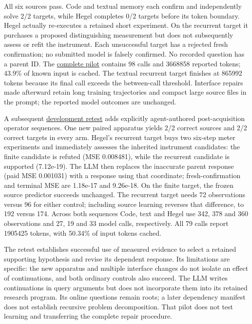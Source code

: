 \documentclass[twoside,11pt]{article}
\begin{document}
All six sources pass. Code and textual memory each confirm and independently
solve 2/2 targets, while Hegel completes 0/2 targets before its token boundary.
Hegel actually re-executes a retained short experiment. On the recurrent target
it purchases a proposed distinguishing measurement but does not subsequently
assess or refit the instrument. Each unsuccessful target has a rejected fresh
confirmation; no submitted model is falsely confirmed. No recorded question
has a parent ID. The \hyperlink{artifact-56}{complete pilot}
contains 98 calls and 3668858 reported tokens; 43.9\% of known input is cached.
The textual recurrent target finishes at 865992 tokens because its final call
exceeds the between-call threshold. Interface repairs made afterward retain
long training trajectories and compact large source files in the prompt;
the reported model outcomes are unchanged.


A subsequent \hyperlink{artifact-57}{development retest}
adds explicitly agent-authored post-acquisition operator sequences. One new
paired apparatus yields 2/2 correct sources and 2/2 correct targets in every
arm. Hegel's recurrent target buys two six-step meter experiments and immediately
assesses the inherited instrument candidates: the finite candidate is refuted
(MSE 0.008481), while the recurrent candidate is supported (7.12e-19). The LLM
then replaces the inaccurate parent response (paid MSE 0.001031) with a response
using that coordinate; fresh-confirmation and terminal MSE are 1.18e-17 and
9.26e-18. On the finite target, the frozen source predictor succeeds unchanged.
The recurrent target needs 72 observations versus 96 for either control;
including source learning reverses that difference, to 192 versus 174. Across
both sequences Code, text and Hegel use 342, 378 and 360 observations and 27, 19
and 33 model calls, respectively. All 79 calls report 1905425 tokens, with
50.34\% of input tokens cached.


The retest establishes successful use of measured evidence to select a retained
supporting hypothesis and revise its dependent response. Its limitations are
specific: the new apparatus and multiple interface changes do not isolate an
effect of continuations, and both ordinary controls also succeed. The LLM writes
continuations in query arguments but does not incorporate them into its retained
research program. Its online questions remain roots; a later dependency manifest
does not establish recursive problem decomposition. That pilot does not test
learning and transferring the complete repair procedure.
\end{document}
